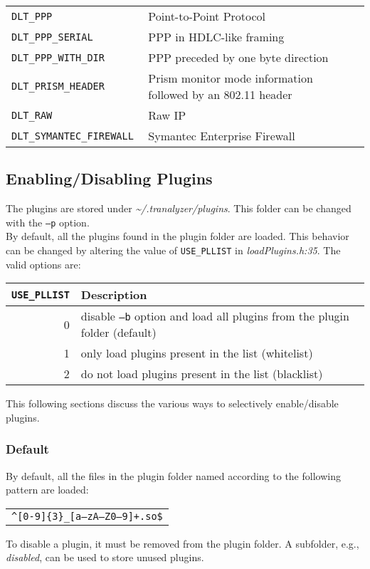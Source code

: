 \begin{longtable}{>{\tt\small}ll>{\tt\small}l}
    DLT\_PPP                & Point-to-Point Protocol                                       & \\
    DLT\_PPP\_SERIAL        & PPP in HDLC-like framing                                      & \\
    DLT\_PPP\_WITH\_DIR     & PPP preceded by one byte direction                            & \\
    DLT\_PRISM\_HEADER      & Prism monitor mode information followed by an 802.11 header   & \\
    DLT\_RAW                & Raw IP                                                        & \\
    DLT\_SYMANTEC\_FIREWALL & Symantec Enterprise Firewall                                  & \\
    \bottomrule
\end{longtable}

\subsection{Enabling/Disabling Plugins}\label{ss:plugins}
The plugins are stored under {\em\textasciitilde{}/.tranalyzer/plugins}.
This folder can be changed with the {\tt --p} option.\\

By default, all the plugins found in the plugin folder are loaded.
This behavior can be changed by altering the value of {\tt USE\_PLLIST} in {\em loadPlugins.h:35}.
The valid options are:
\begin{longtable}{rl}
    \toprule
    {\tt USE\_PLLIST} & {\bf Description}\\
    \midrule\endhead%
    0 & disable {\tt --b} option and load all plugins from the plugin folder (default)\\ %
    1 & only load plugins present in the list (whitelist)\\
    2 & do not load plugins present in the list (blacklist)\\
    \bottomrule
\end{longtable}

This following sections discuss the various ways to selectively enable/disable plugins.

\subsubsection{Default}
By default, all the files in the plugin folder named according to the following pattern are loaded:\\
\begin{longtable}{>{\tt}c}
    \textasciicircum[0-9]\{3\}\_[a--zA--Z0--9]+.so\$
\end{longtable}
To disable a plugin, it must be removed from the plugin folder. A subfolder, e.g., {\em disabled}, can be used to store unused plugins.

